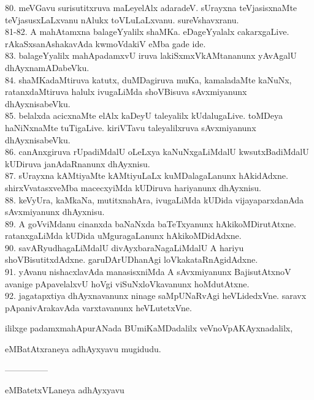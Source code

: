 \documentclass{article}
\begin{document}
80. meVGavu surisutitxruva maLeyelAlx adaradeV. sUrayxna teVjasisxnaMte teVjasusxLaLxvanu nAlukx toVLuLaLxvanu. sureVshavxranu.\\
81-82. A mahAtamxna balageYyalilx shaMKa. eDageYyalalx cakarxgaLive. rAkaSxsanAshakavAda kwmoVdakiV eMba gade ide.\\
83.  balageYyalilx mahApadamxvU iruva lakiSxmxVkAMtananunx yAvAgalU dhAyxnamADabeVku.\\
84. shaMKadaMtiruva katutx, duMDagiruva muKa, kamaladaMte kaNuNx, ratanxdaMtiruva halulx ivugaLiMda shoVBisuva sAvxmiyanunx dhAyxnisabeVku.\\
85. belalxda acicxnaMte elAlx kaDeyU taleyalilx kUdalugaLive. toMDeya haNiNxnaMte tuTigaLive. kiriVTavu taleyalilxruva sAvxmiyanunx dhAyxnisabeVku.\\
86. canAnxgiruva rUpadiMdalU oLeLxya kaNuNxgaLiMdalU kwsutxBadiMdalU kUDiruva janAdaRnanunx dhAyxnisu.\\
87. sUrayxna kAMtiyaMte kAMtiyuLaLx kuMDalagaLanunx hAkidAdxne. shirxVvatasxveMba macecxyiMda kUDiruva hariyanunx dhAyxnisu.\\
88. keVyUra, kaMkaNa, mutitxnahAra, ivugaLiMda kUDida vijayaparxdanAda sAvxmiyanunx dhAyxnisu.\\
89. A goVviMdanu cinanxda baNaNxda baTeTxyanunx hAkikoMDirutAtxne. ratanxgaLiMda kUDida uMguragaLanunx hAkikoMDidAdxne.\\
90. savARyudhagaLiMdalU divAyxbaraNagaLiMdalU A hariyu shoVBisutitxdAdxne. garuDArUDhanAgi loVkakataRnAgidAdxne.\\
91. yAvanu nishacxlavAda manasisxniMda A sAvxmiyanunx BajisutAtxnoV avanige pApavelalxvU hoVgi viSuNxloVkavanunx hoMdutAtxne.\\
92. jagatapxtiya dhAyxnavanunx ninage saMpUNaRvAgi heVLidedxVne. saravx pApanivArakavAda varxtavanunx heVLutetxVne.

\begin{center}
ililxge padamxmahApurANada BUmiKaMDadalilx veVnoVpAKAyxnadalilx,
\end{center}

\begin{center}
eMBatAtxraneya adhAyxyavu mugidudu.
\end{center}

\begin{center}
---------------
\end{center}

\begin{center}
eMBatetxVLaneya adhAyxyavu
\end{center}
\end{document}
